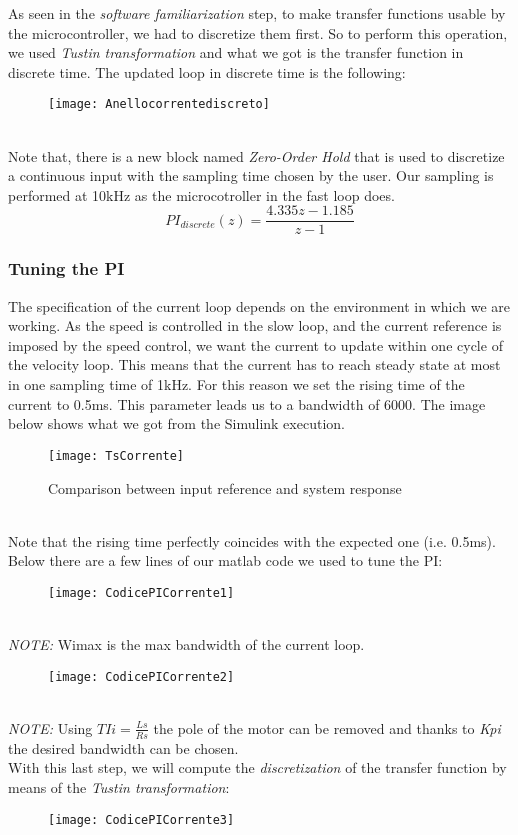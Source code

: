 \documentclass[12pt]{article}
\begin{document}
As seen in the \textit{software familiarization} step, to make transfer functions usable by the microcontroller, we had to discretize them first.
So to perform this operation, we used \textit{Tustin transformation} and what we got is the transfer function in discrete time.
The updated loop in discrete time is the following:
\begin{figure}[h]
\centering
\texttt{[image: Anellocorrentediscreto]}
\end{figure}\\
Note that, there is a new block named \textit{Zero-Order Hold} that is used to discretize a continuous input with the sampling time chosen by the user. Our sampling is performed at 10kHz as the microcotroller in the fast loop does.\\[0.5cm]
$$PI_{discrete}(z)=\frac{4.335z-1.185}{z-1}$$

\subsubsection*{Tuning the PI}
The specification of the current loop depends on the environment in which we are working. As the speed is controlled in the slow loop, and the current reference is imposed by the speed control, we want the current to update within one cycle of the velocity loop. This means that the current has to reach steady state at most in one sampling time of 1kHz. For this reason we set the rising time of the current to 0.5ms. This parameter leads us to a bandwidth of 6000.
The image below shows what we got from the Simulink execution. 
\begin{figure}[h]
\centering
\texttt{[image: TsCorrente]}
\caption{Comparison between input reference and system response}
\end{figure}\\
Note that the rising time perfectly coincides with the expected one (i.e. 0.5ms).\\
Below there are a few lines of our matlab code we used to tune the PI:
\begin{figure}[h]
\texttt{[image: CodicePICorrente1]}
\end{figure}\\
\textit{NOTE:} Wimax is the max bandwidth of the current loop.
\begin{figure}[h]
\texttt{[image: CodicePICorrente2]}
\end{figure}\\
\textit{NOTE:} Using $TIi=\frac{Ls}{Rs}$ the pole of the motor can be removed and thanks to \textit{Kpi} the desired bandwidth can be chosen.\\[0.5cm]
With this last step, we will compute the \textit{discretization} of the transfer function by means of the \textit{Tustin transformation}:
\begin{figure}[h]
\texttt{[image: CodicePICorrente3]}
\end{figure}\\
\end{document}

